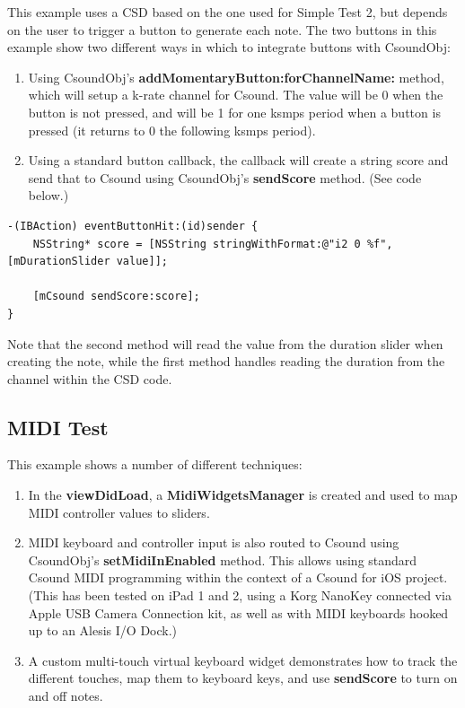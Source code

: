 \documentclass[11pt]{article}
\begin{document}
This example uses a CSD based on the one used for Simple Test 2, but depends on the user to trigger a button to generate each note.  The two buttons in this example show two different ways in which to integrate buttons with CsoundObj:

\begin{enumerate}
\item Using CsoundObj's \textbf{addMomentaryButton:forChannelName:} method, which will setup a k-rate channel for Csound.  The value will be 0 when the button is not pressed, and will be 1 for one ksmps period when a button is pressed (it returns to 0 the following ksmps period).
\item Using a standard button callback, the callback will create a string score and send that to Csound using CsoundObj's \textbf{sendScore} method. (See code below.)
\end{enumerate}


\begin{lstlisting}[caption=Example code showing sending score text to CsoundObj]
-(IBAction) eventButtonHit:(id)sender {
    NSString* score = [NSString stringWithFormat:@"i2 0 %f", [mDurationSlider value]];

    [mCsound sendScore:score];
}
\end{lstlisting}

Note that the second method will read the value from the duration slider when creating the note, while the first method handles reading the duration from the channel within the CSD code.

\subsection{MIDI Test}

This example shows a number of different techniques:

\begin{enumerate}
\item In the \textbf{viewDidLoad}, a \textbf{MidiWidgetsManager} is created and used to map MIDI controller values to sliders.
\item MIDI keyboard and controller input is also routed to Csound using CsoundObj's \textbf{setMidiInEnabled} method. This allows using standard Csound MIDI programming within the context of a Csound for iOS project. (This has been tested on iPad 1 and 2, using a Korg NanoKey connected via Apple USB Camera Connection kit, as well as with MIDI keyboards hooked up to an Alesis I/O Dock.)
\item A custom multi-touch virtual keyboard widget demonstrates how to track the different touches, map them to keyboard keys, and use \textbf{sendScore} to turn on and off notes.
\end{enumerate}
\end{document}
